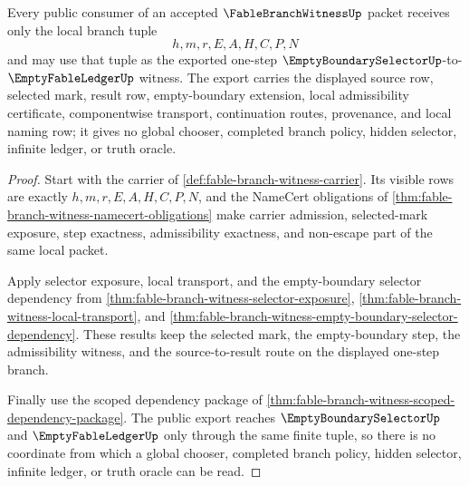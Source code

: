 \begin{theorem}
\label{thm:fablebranchwitness-public-export}
Every public consumer of an accepted $\FableBranchWitnessUp$ packet receives only the local branch tuple
$$
h,m,r,E,A,H,C,P,N
$$
and may use that tuple as the exported one-step $\EmptyBoundarySelectorUp$-to-$\EmptyFableLedgerUp$ witness. The export carries the displayed source row, selected mark, result row, empty-boundary extension, local admissibility certificate, componentwise transport, continuation routes, provenance, and local naming row; it gives no global chooser, completed branch policy, hidden selector, infinite ledger, or truth oracle.
\end{theorem}
\begin{proof}
Start with the carrier of \autoref{def:fable-branch-witness-carrier}. Its visible rows are exactly $h,m,r,E,A,H,C,P,N$, and the NameCert obligations of \autoref{thm:fable-branch-witness-namecert-obligations} make carrier admission, selected-mark exposure, step exactness, admissibility exactness, and non-escape part of the same local packet.

Apply selector exposure, local transport, and the empty-boundary selector dependency from \autoref{thm:fable-branch-witness-selector-exposure}, \autoref{thm:fable-branch-witness-local-transport}, and \autoref{thm:fable-branch-witness-empty-boundary-selector-dependency}. These results keep the selected mark, the empty-boundary step, the admissibility witness, and the source-to-result route on the displayed one-step branch.

Finally use the scoped dependency package of \autoref{thm:fable-branch-witness-scoped-dependency-package}. The public export reaches $\EmptyBoundarySelectorUp$ and $\EmptyFableLedgerUp$ only through the same finite tuple, so there is no coordinate from which a global chooser, completed branch policy, hidden selector, infinite ledger, or truth oracle can be read.
\end{proof}



